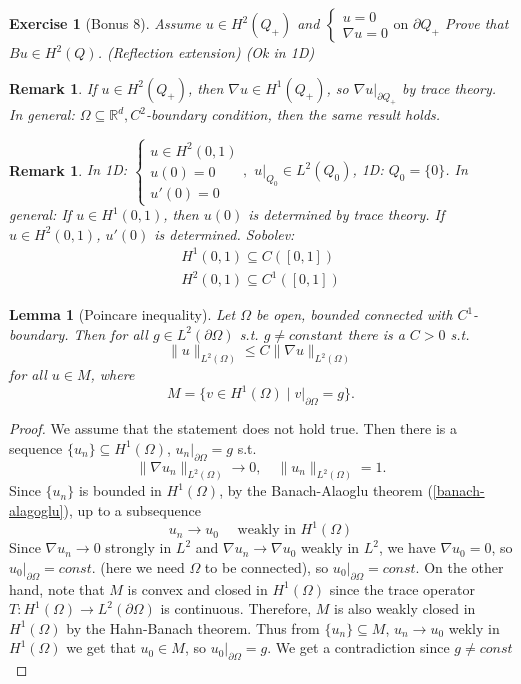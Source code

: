 \documentclass{report}
\theoremstyle{tommy}
\newtheorem{lem}[defn]{Lemma}
\newtheorem{rem}[defn]{Remark}
\newtheorem{ex}[defn]{Exercise}
\begin{document}
  \begin{ex}[Bonus 8]
    Assume \(u \in H^2(Q_+)\) and \(\begin{cases}
      u = 0 \\ \nabla u = 0 
    \end{cases}\text{on } \partial Q_+\)
    Prove that \(Bu \in H^2(Q)\). (Reflection extension) (Ok in 1D)
  \end{ex}
  
  \begin{rem}
    If \(u \in H^2(Q_+)\), then \(\nabla u \in H^1(Q_+)\), so \(\nabla u|_{\partial Q_+}\) by trace theory. In general: \(\Omega \subseteq \mathbb{R}^d, C^2\)-boundary condition, then the same result holds.
  \end{rem}

  \begin{rem}
    In 1D: \(\begin{cases}
      u \in H^2(0,1) \\ u(0) = 0 \\ u'(0) = 0
    \end{cases},\) \(u|_{Q_0} \in L^2(Q_0)\), 1D: \(Q_0 = \{0\}\). In general: If \(u \in H^1(0,1)\), then \(u(0)\) is determined by trace theory. If \(u \in H^2(0,1)\), \(u'(0)\) is determined. Sobolev:
    \begin{align*}
      H^1(0,1) \subseteq C([0,1]) \\ H^2(0,1) \subseteq C^1([0,1])
    \end{align*}    
  \end{rem}
  
  \begin{lem}[Poincare inequality]\label{Poincare inequality for L2}
    Let \(\Omega\) be open, bounded connected with \(C^1\)-boundary. Then for all \(g \in L^2(\partial \Omega)\) s.t. \(g \ne constant\) there is a \(C > 0\) s.t. 
    \[\|u\|_{L^2(\Omega)} \le C \|\nabla u\|_{L^2(\Omega)}\]
    for all \(u \in M\), where 
    \[M = \{v \in H^1(\Omega) \mid v|_{\partial \Omega} = g\}.\]
  \end{lem}

  \begin{proof}
    We assume that the statement does not hold true. Then there is a sequence \(\{u_n\} \subseteq H^1(\Omega)\), \(u_n|_{\partial \Omega} = g\) s.t.
    \[\|\nabla u_n\|_{L^2(\Omega)} \to 0, \quad \|u_n\|_{L^2(\Omega)} = 1.\]
    Since \(\{u_n\}\) is bounded in \(H^1(\Omega)\), by the Banach-Alaoglu theorem (\ref{banach-alagoglu}), up to a subsequence 
    \[u_n \to u_0 \quad \text{ weakly in } H^1(\Omega)\]
    Since \(\nabla u_n \to 0\) strongly in \(L^2\) and \(\nabla u_n \to \nabla u_0\) weakly in \(L^2\), we have \(\nabla u_0 = 0\), so \(u_0|_{\partial \Omega} = const.\) (here we need \(\Omega\) to be connected), so \(u_0|_{\partial \Omega} = const.\) On the other hand, note that \(M\) is convex and closed in \(H^1(\Omega)\) since the trace operator \(T: H^1(\Omega) \to L^2(\partial \Omega)\) is continuous. Therefore, \(M\) is also weakly closed in \(H^1(\Omega)\) by the Hahn-Banach theorem. Thus from \(\{u_n\} \subseteq M\), \(u_n \to u_0\) wekly in \(H^1(\Omega)\) we get that \(u_0 \in M\), so \(u_0|_{\partial \Omega} = g\). We get a contradiction since \(g \ne const\) 
  \end{proof}
\end{document}
